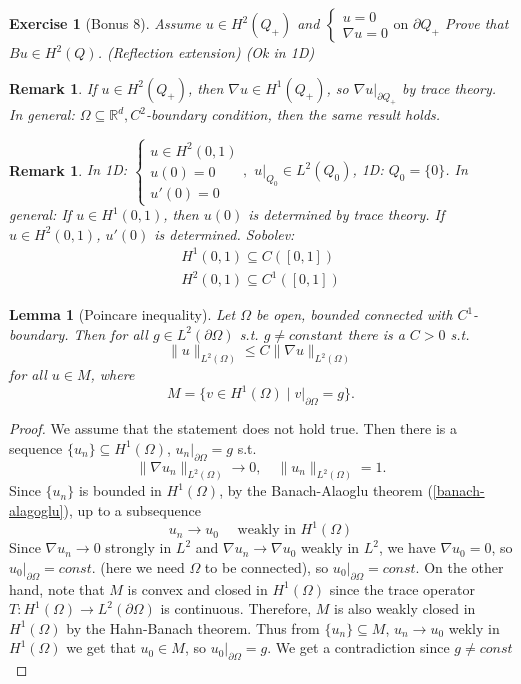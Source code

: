 \documentclass{report}
\theoremstyle{tommy}
\newtheorem{lem}[defn]{Lemma}
\newtheorem{rem}[defn]{Remark}
\newtheorem{ex}[defn]{Exercise}
\begin{document}
  \begin{ex}[Bonus 8]
    Assume \(u \in H^2(Q_+)\) and \(\begin{cases}
      u = 0 \\ \nabla u = 0 
    \end{cases}\text{on } \partial Q_+\)
    Prove that \(Bu \in H^2(Q)\). (Reflection extension) (Ok in 1D)
  \end{ex}
  
  \begin{rem}
    If \(u \in H^2(Q_+)\), then \(\nabla u \in H^1(Q_+)\), so \(\nabla u|_{\partial Q_+}\) by trace theory. In general: \(\Omega \subseteq \mathbb{R}^d, C^2\)-boundary condition, then the same result holds.
  \end{rem}

  \begin{rem}
    In 1D: \(\begin{cases}
      u \in H^2(0,1) \\ u(0) = 0 \\ u'(0) = 0
    \end{cases},\) \(u|_{Q_0} \in L^2(Q_0)\), 1D: \(Q_0 = \{0\}\). In general: If \(u \in H^1(0,1)\), then \(u(0)\) is determined by trace theory. If \(u \in H^2(0,1)\), \(u'(0)\) is determined. Sobolev:
    \begin{align*}
      H^1(0,1) \subseteq C([0,1]) \\ H^2(0,1) \subseteq C^1([0,1])
    \end{align*}    
  \end{rem}
  
  \begin{lem}[Poincare inequality]\label{Poincare inequality for L2}
    Let \(\Omega\) be open, bounded connected with \(C^1\)-boundary. Then for all \(g \in L^2(\partial \Omega)\) s.t. \(g \ne constant\) there is a \(C > 0\) s.t. 
    \[\|u\|_{L^2(\Omega)} \le C \|\nabla u\|_{L^2(\Omega)}\]
    for all \(u \in M\), where 
    \[M = \{v \in H^1(\Omega) \mid v|_{\partial \Omega} = g\}.\]
  \end{lem}

  \begin{proof}
    We assume that the statement does not hold true. Then there is a sequence \(\{u_n\} \subseteq H^1(\Omega)\), \(u_n|_{\partial \Omega} = g\) s.t.
    \[\|\nabla u_n\|_{L^2(\Omega)} \to 0, \quad \|u_n\|_{L^2(\Omega)} = 1.\]
    Since \(\{u_n\}\) is bounded in \(H^1(\Omega)\), by the Banach-Alaoglu theorem (\ref{banach-alagoglu}), up to a subsequence 
    \[u_n \to u_0 \quad \text{ weakly in } H^1(\Omega)\]
    Since \(\nabla u_n \to 0\) strongly in \(L^2\) and \(\nabla u_n \to \nabla u_0\) weakly in \(L^2\), we have \(\nabla u_0 = 0\), so \(u_0|_{\partial \Omega} = const.\) (here we need \(\Omega\) to be connected), so \(u_0|_{\partial \Omega} = const.\) On the other hand, note that \(M\) is convex and closed in \(H^1(\Omega)\) since the trace operator \(T: H^1(\Omega) \to L^2(\partial \Omega)\) is continuous. Therefore, \(M\) is also weakly closed in \(H^1(\Omega)\) by the Hahn-Banach theorem. Thus from \(\{u_n\} \subseteq M\), \(u_n \to u_0\) wekly in \(H^1(\Omega)\) we get that \(u_0 \in M\), so \(u_0|_{\partial \Omega} = g\). We get a contradiction since \(g \ne const\) 
  \end{proof}
\end{document}
